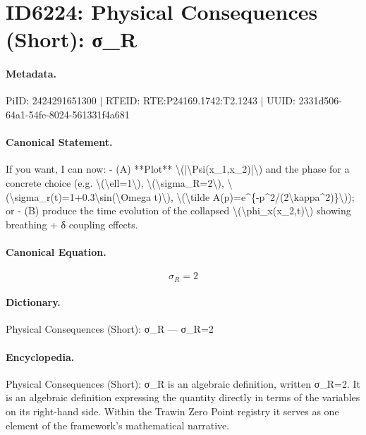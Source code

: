 \section*{ID6224: Physical Consequences (Short): σ\_R}
\paragraph{Metadata.}
PiID: 2424291651300 | RTEID: RTE:P24169.1742:T2.1243 | UUID: 2331d506-64a1-54fe-8024-561331f4a681

\paragraph{Canonical Statement.}
If you want, I can now: - (A) **Plot** \textbackslash{}(|\textbackslash{}Psi(x\_1,x\_2)|\textbackslash{}) and the phase for a concrete choice (e.g. \textbackslash{}(\textbackslash{}ell=1\textbackslash{}), \textbackslash{}(\textbackslash{}sigma\_R=2\textbackslash{}), \textbackslash{}(\textbackslash{}sigma\_r(t)=1+0.3\textbackslash{}sin(\textbackslash{}Omega t)\textbackslash{}), \textbackslash{}(\textbackslash{}tilde A(p)=e\textasciicircum{}\{-p\textasciicircum{}2/(2\textbackslash{}kappa\textasciicircum{}2)\}\textbackslash{})); or - (B) produce the time evolution of the collapsed \textbackslash{}(\textbackslash{}phi\_x(x\_2,t)\textbackslash{}) showing breathing + δ coupling effects.

\paragraph{Canonical Equation.}
\[
\sigma_R=2
\]

\paragraph{Dictionary.}
Physical Consequences (Short): σ\_R — σ\_R=2

\paragraph{Encyclopedia.}
Physical Consequences (Short): σ\_R is an algebraic definition, written σ\_R=2. It is an algebraic definition expressing the quantity directly in terms of the variables on its right-hand side. Within the Trawin Zero Point registry it serves as one element of the framework's mathematical narrative.
